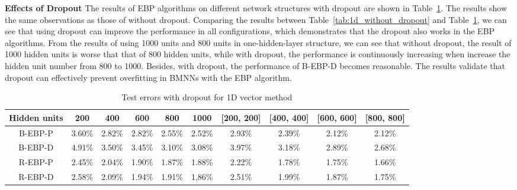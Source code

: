 \documentclass{article} %
\begin{document}
\textbf{Effects of Dropout} The results of EBP algorithms on different network structures with dropout are shown in Table~\ref{tab:1d_with_dropout}. The results show the same observations as those of without dropout. Comparing the results between Table~\ref{tab:1d_without_dropout} and Table~\ref{tab:1d_with_dropout}, we can see that using dropout can improve the performance in all configurations, which demonstrates that the dropout also works in the EBP algorithms. From the results of using 1000 units and 800  units in one-hidden-layer structure, we can see that without dropout, the result of 1000 hidden units is worse that that of 800 hidden units, while with dropout, the performance is continuously increasing when increase the hidden unit number from 800 to 1000. Besides, with dropout, the performance of B-EBP-D becomes reasonable. The results validate that dropout can effectively prevent overfitting in BMNNs with the EBP algorithm.
\begin{table}
\scriptsize
\centering
\caption{Test errors with dropout for 1D vector method}
\begin{tabular}{|c||c|c|c|c|c||c|c|c|c|} \hline
Hidden units	&	200	&	400	&	600	&	800	&	1000	&	[200, 200]	&	[400, 400]	&	[600, 600]	&	[800, 800]	\\ \hline \hline
B-EBP-P	&	3.60\%	&	2.82\%	&	2.82\%	&	2.55\%	&	2.52\%	&2.93\%	&2.39\%	&2.12\%	&2.12\%	\\ \hline
B-EBP-D	&	4.91\%	&	3.50\%	&	3.45\%	&	3.10\%	&	3.08\%	&3.97\%	&3.18\%	&2.89\%	&2.68\%	\\ \hline \hline
R-EBP-P	&	2.45\%	&	2.04\%	&	1.90\%	&	1.87\%	&	1.88\%	&2.22\%	&1.78\%	&1.75\%	&1.66\%	\\ \hline
R-EBP-D	&	2.58\%	&	2.09\%	&	1.94\%	&	1.91\%	&	1,86\%	&2.51\%	&1.99\%	&1.87\%	&1.75\%		\\ \hline
\end{tabular}

 \label{tab:1d_with_dropout}
\end{table}
\end{document}
